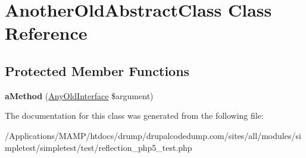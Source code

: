 \hypertarget{class_another_old_abstract_class}{
\section{AnotherOldAbstractClass Class Reference}
\label{class_another_old_abstract_class}
}
\subsection*{Protected Member Functions}
\begin{DoxyCompactItemize}
\item 
\hypertarget{class_another_old_abstract_class_a639c0d4d9e660efad6fc886ab4d0ba57}{
{\bfseries aMethod} (\hyperlink{interface_any_old_interface}{AnyOldInterface} \$argument)}
\label{class_another_old_abstract_class_a639c0d4d9e660efad6fc886ab4d0ba57}

\end{DoxyCompactItemize}


The documentation for this class was generated from the following file:\begin{DoxyCompactItemize}
\item 
/Applications/MAMP/htdocs/drump/drupalcodedump.com/sites/all/modules/simpletest/simpletest/test/reflection\_\-php5\_\-test.php\end{DoxyCompactItemize}

